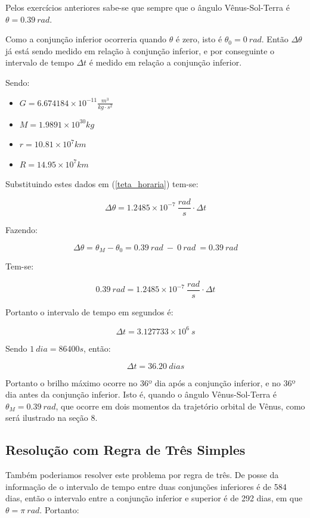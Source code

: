 \documentclass[a4paper, 12pt]{article}
\begin{document}
Pelos exercícios anteriores sabe-se que sempre que o ângulo Vênus-Sol-Terra é $\theta = 0.39\ rad$.

Como a conjunção inferior ocorreria quando $\theta$ é zero, isto é $\theta_0=0\ rad$. Então $\Delta \theta$ já está sendo medido em relação à conjunção inferior, e por conseguinte o intervalo de tempo $\Delta t$ é medido em relação a conjunção inferior. 

Sendo:

\begin{itemize}
  \item $G=6.674184\times 10^{-11}\frac{m^3}{kg\cdot s^2}$
  \item $M=1.9891\times 10^{30}kg$
  \item $r=10.81\times 10^7 km$
  \item $R=14.95\times 10^7 km$
\end{itemize}

Substituindo estes dados em (\ref{teta_horaria}) tem-se:

$$\Delta \theta =1.2485\times 10^{-7}\ \frac{rad}{s}\cdot \Delta t$$

Fazendo:

$$\Delta \theta =\theta _M-\theta _0=0.39\ rad\ -\ 0\ rad\ =0.39\ rad$$

Tem-se:

$$0.39\ rad=1.2485\times 10^{-7}\ \frac{rad}{s}\cdot \Delta t$$

Portanto o intervalo de tempo em segundos é:

$$\Delta t=3.127733\times 10^6\ s$$

Sendo $1\ dia = 86400 s$, então:

$$\boxed{\ \Delta t=36.20\ dias\ }$$

Portanto o brilho máximo ocorre no 36º dia após a conjunção inferior, e no 36º dia antes da conjunção inferior. Isto é, quando o ângulo Vênus-Sol-Terra é $\theta_M=0.39\ rad$, que ocorre em dois momentos da trajetório orbital de Vênus, como será ilustrado na seção 8.

\subsection{Resolução com Regra de Três Simples}

Também poderiamos resolver este problema por regra de três. De posse da informação de o intervalo de tempo entre duas conjunções inferiores é de 584 dias, então o intervalo entre a conjunção inferior e superior é de 292 dias, em que $\theta = \pi \ rad$. Portanto:
\end{document}
